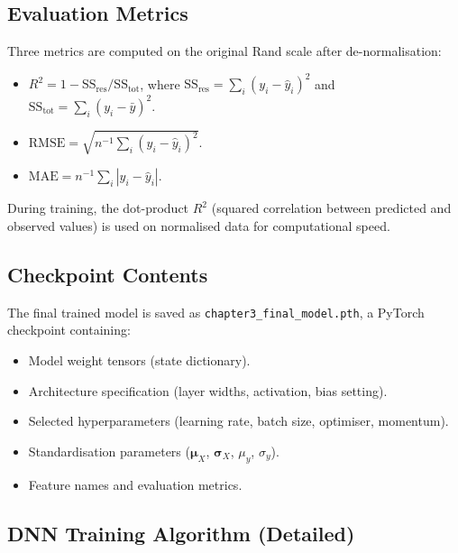 \subsection{Evaluation Metrics}
\label{annexure:eval_helpers}

Three metrics are computed on the original Rand scale after de-normalisation:
\begin{itemize}
    \item $R^2 = 1 - \mathrm{SS}_{\mathrm{res}} / \mathrm{SS}_{\mathrm{tot}}$, where $\mathrm{SS}_{\mathrm{res}} = \sum_i (y_i - \hat{y}_i)^2$ and $\mathrm{SS}_{\mathrm{tot}} = \sum_i (y_i - \bar{y})^2$.
    \item $\mathrm{RMSE} = \sqrt{n^{-1} \sum_i (y_i - \hat{y}_i)^2}$.
    \item $\mathrm{MAE} = n^{-1} \sum_i |y_i - \hat{y}_i|$.
\end{itemize}

During training, the dot-product \ensuremath{R^2} (squared correlation between predicted and observed values) is used on normalised data for computational speed.

\subsection{Checkpoint Contents}
\label{annexure:final_model}

The final trained model is saved as \texttt{chapter3\_final\_\allowbreak{}model.pth}, a PyTorch checkpoint containing:
\begin{itemize}
    \item Model weight tensors (state dictionary).
    \item Architecture specification (layer widths, activation, bias setting).
    \item Selected hyperparameters (learning rate, batch size, optimiser, momentum).
    \item Standardisation parameters ($\boldsymbol{\mu}_X$, $\boldsymbol{\sigma}_X$, $\mu_y$, $\sigma_y$).
    \item Feature names and evaluation metrics.
\end{itemize}

\subsection{DNN Training Algorithm (Detailed)}
\label{annexure:dnn_algorithm_detailed}

